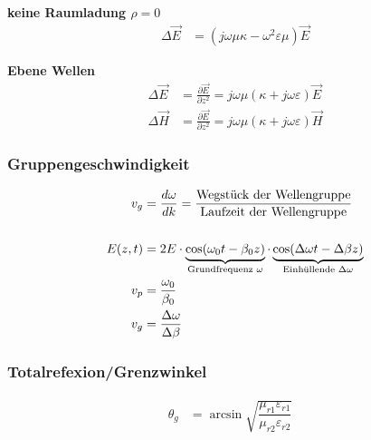 \textbf{keine Raumladung $ \rho = 0$}
\begin{align*}
    \Delta \vec{E} & = (j \omega \mu \kappa - \omega^2 \varepsilon \mu ) \vec{E}
\end{align*}

\textbf{Ebene Wellen}
\begin{align*}
    \Delta \vec{E} & = \frac{ \partial \vec{E}}{ \partial z^2} = j \omega \mu ( \kappa + j \omega \varepsilon) \vec{E} \\
    \Delta \vec{H} & = \frac{ \partial \vec{E}}{ \partial z^2} = j \omega \mu ( \kappa + j \omega \varepsilon) \vec{H}
\end{align*}


\subsubsection{Gruppengeschwindigkeit}
\begin{align*}   
    v_g        &= \dfrac{d \omega}{d k} = \dfrac{\textnormal{Wegstück der Wellengruppe}}{\textnormal{Laufzeit der Wellengruppe}}    \\                                                                                                                                                                                     \\
    E(z,t)     & = 2E\cdot\underbrace{\cos(\omega_0t-\beta_0z)}_{\mathclap{\text{Grundfrequenz $\omega$}}}\cdot\underbrace{\cos(\Delta\omega t-\Delta\beta z)}_{\mathclap{\text{Einhüllende $\Delta\omega$}}} \\
    v_p        & = \frac{\omega_0}{\beta_0}                                                                                                                                                                   \\
    v_g        & = \frac{\Delta\omega}{\Delta\beta}
\end{align*}

\subsubsection{Totalrefexion/Grenzwinkel}
\begin{align*}
    \theta_g & = \arcsin \sqrt{ \dfrac{\mu_{r1} \varepsilon_{r1}}{\mu_{r2} \varepsilon_{r2}}} &
\end{align*}

